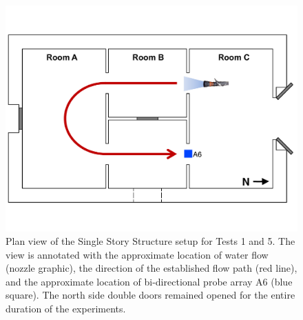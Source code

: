 \documentclass[12pt,oneside]{book}
\begin{document}
\begin{figure}[!ht]
	\includegraphics[width=\columnwidth]{../Figures/Floor_Plans/Specific_Tests/East_Hose_Test_Annotated}
	\caption[Plan view of the Single Story Structure setup for Tests 1 and 5.]{Plan view of the Single Story Structure setup for Tests 1 and 5. The view is annotated with the approximate location of water flow (nozzle graphic), the direction of the established flow path (red line), and the approximate location of bi-directional probe array A6 (blue square). The north side double doors remained opened for the entire duration of the experiments.}
	\label{fig:east_setup}
\end{figure}
\FloatBarrier
\end{document}
